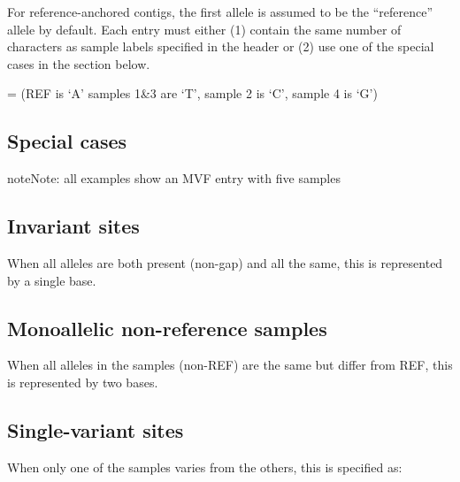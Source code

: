 \documentclass[letterpaper,11pt,english]{sphinxmanual}
\begin{document}
For reference-anchored contigs, the first allele is assumed to be the “reference” allele by default. Each entry must either (1) contain the same number of characters as sample labels specified in the header or (2) use one of the special cases in the section below.

 =  (REF is ‘A’ samples 1\&3 are ‘T’, sample 2 is ‘C’, sample 4 is ‘G’)


\subsection{Special cases}
\label{\detokenize{mvf_spec:special-cases}}
\begin{sphinxadmonition}{note}{Note:}
all examples show an MVF entry with five samples
\end{sphinxadmonition}


\subsection{Invariant sites}
\label{\detokenize{mvf_spec:invariant-sites}}
When all alleles are both present (non-gap) and all the same, this is represented by a single base.
\begin{quote}

\end{quote}


\subsection{Monoallelic non-reference samples}
\label{\detokenize{mvf_spec:monoallelic-non-reference-samples}}
When all alleles in the samples (non-REF) are the same but differ from REF, this is represented by two bases.
\begin{quote}

\end{quote}


\subsection{Single-variant sites}
\label{\detokenize{mvf_spec:single-variant-sites}}
When only one of the samples varies from the others, this is specified as:

\begin{sphinxVerbatim}[commandchars=\\\{\}]
\PYG{p}{[}    \PYG{p}{]}
\end{sphinxVerbatim}
\end{document}
